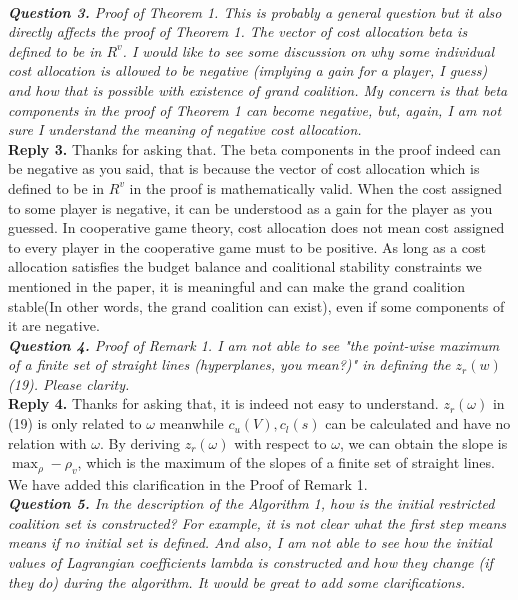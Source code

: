 \documentclass[11pt]{article}
\begin{document}
\\[4mm]
%
%
%
\noindent \textit{\textbf{Question 3.}
Proof of Theorem 1. This is probably a general question but it also directly affects the proof of Theorem 1. The vector of cost allocation beta is defined to be in $R^v$.
I would like to see some discussion on why some individual cost allocation is allowed to be negative (implying a gain for a player, I guess) and how that is possible with existence of grand coalition. My concern is that beta components in the proof of Theorem 1 can become negative, but, again, I am not sure I understand the meaning of negative cost allocation.}
\\[2mm]
\noindent \textbf{Reply 3.}
Thanks for asking that. The beta components in the proof indeed can be negative as you said, that is because the vector of cost allocation which is defined to be in $R^v$ in the proof is mathematically valid. When the cost assigned to some player is negative, it can be understood as a gain for the player as you guessed. In cooperative game theory, cost allocation does not mean cost assigned to every player in the cooperative game must to be positive. As long as a cost allocation satisfies the budget balance and coalitional stability constraints we mentioned in the paper, it is meaningful and can make the grand coalition stable(In other words, the grand coalition can exist), even if some components of it are negative.
\\[4mm]
%
%
%
\noindent \textit{\textbf{Question 4.}
Proof of Remark 1. I am not able to see "the point-wise maximum of a finite set of straight lines (hyperplanes, you mean?)" in defining the $z_r(w)$ (19). Please clarity.}
\\[2mm]
\noindent \textbf{Reply 4.}
Thanks for asking that, it is indeed not easy to understand.
$z_r(\omega)$ in (19) is only related to $\omega$ meanwhile $c_u(V), c_l(s)$ can be calculated and have no relation with $\omega$. By deriving $z_r(\omega)$ with respect to $\omega$, we can obtain the slope is $\max_\rho -\rho_v$, which is the maximum of the slopes of a finite set of straight lines. We have added this clarification in the Proof of Remark 1.
\\[4mm]
%
%
%
\noindent \textit{\textbf{Question 5.}
In the description of the Algorithm 1, how is the initial restricted coalition set is constructed? For example, it is not clear what the first step means means if no initial set is defined. And also, I am not able to see how the initial values of Lagrangian coefficients lambda is constructed and how they change (if they do) during the algorithm. It would be great to add some clarifications.}
\end{document}
